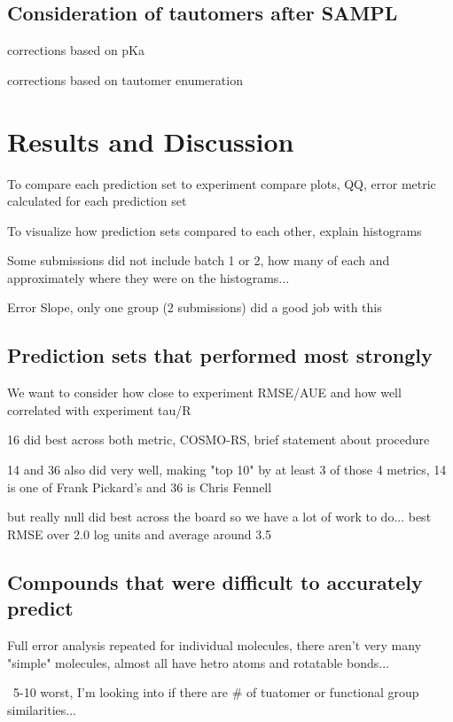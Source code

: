 \subsection{Consideration of tautomers after SAMPL}
\label{methods:post}
corrections based on pKa

corrections based on tautomer enumeration

\section{Results and Discussion}
\label{results:1}
To compare each prediction set to experiment compare plots, QQ, error metric calculated for each prediction set

To visualize how prediction sets compared to each other, explain histograms

Some submissions did not include batch 1 or 2, how many of each and approximately where they were on the histograms...

Error Slope, only one group (2 submissions) did a good job with this %


\subsection{Prediction sets that performed most strongly}
\label{results:2}
We want to consider how close to experiment RMSE/AUE and how well correlated with experiment tau/R

16 did best across both metric, COSMO-RS, brief statement about procedure

14 and 36 also did very well, making "top 10" by at least 3 of those 4 metrics, 14 is one of Frank Pickard's and 36 is Chris Fennell

but really null did best across the board so we have a lot of work to do... best RMSE over 2.0 log units and average around 3.5

\subsection{Compounds that were difficult to accurately predict}
\label{results:3}
Full error analysis repeated for individual molecules, there aren't very many "simple" molecules, almost all have hetro atoms and rotatable bonds...

~5-10 worst, I'm looking into if there are # of tuatomer or functional group similarities...

